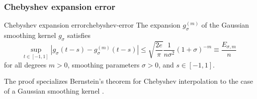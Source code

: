\documentclass[12pt]{article}
\begin{document}
\subsubsection{Chebyshev expansion error}
\label{subsubsec:expansion-error}

\begin{lemma}{Chebyshev expansion error}{chebyshev-error}
    The expansion $g_{\sigma}^{(m)}$ of the Gaussian smoothing kernel $g_{{\sigma}}$ satisfies
    \begin{equation}
        \sup_{t \in [-1, 1]} \left| g_{\sigma}(t - s) - g_{\sigma}^{(m)}(t - s) \right| \leq \sqrt{\frac{2e}{\pi}} \frac{1}{n \sigma^2} (1 + \sigma)^{-m} \equiv \frac{E_{\sigma, m}}{n}
        \label{equ:2-chebyshev-interpolation-sup-error-kernel}
    \end{equation}
    for all degrees $m > 0$, smoothing parameters $\sigma > 0$, and $s \in [-1, 1]$.
\end{lemma}

The proof specializes Bernstein's theorem for Chebyshev interpolation to the case of a Gaussian smoothing kernel .
\end{document}
